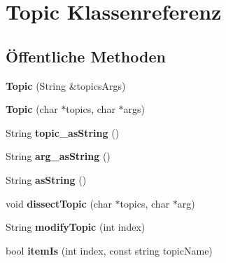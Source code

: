 \hypertarget{class_topic}{}\section{Topic Klassenreferenz}
\label{class_topic}
\subsection*{Öffentliche Methoden}
\begin{DoxyCompactItemize}
\item 
\mbox{\label{class_topic_a0a440ad48222b711fc0568bb66bbcf64}} 
{\bfseries Topic} (String \&topics\+Args)
\item 
\mbox{\label{class_topic_a9288183546263ded5b071462c9515f71}} 
{\bfseries Topic} (char $\ast$topics, char $\ast$args)
\item 
\mbox{\label{class_topic_a08531a42771dcb911dcf800feb5623fb}} 
String {\bfseries topic\+\_\+as\+String} ()
\item 
\mbox{\label{class_topic_a0de810b3f2179e9f13dbe34029e5dafe}} 
String {\bfseries arg\+\_\+as\+String} ()
\item 
\mbox{\label{class_topic_a19bdafb2d4bb697323cc51999715436d}} 
String {\bfseries as\+String} ()
\item 
\mbox{\label{class_topic_a90ad578f6e8e61da6299052df5dc8c19}} 
void {\bfseries dissect\+Topic} (char $\ast$topics, char $\ast$arg)
\item 
\mbox{\label{class_topic_a3518620d9036102c1afb57877afa3883}} 
String {\bfseries modify\+Topic} (int index)
\item 
\mbox{\label{class_topic_ab0145e4229a16c728ddb5caa40b42120}} 
bool {\bfseries item\+Is} (int index, const string topic\+Name)
\end{DoxyCompactItemize}
